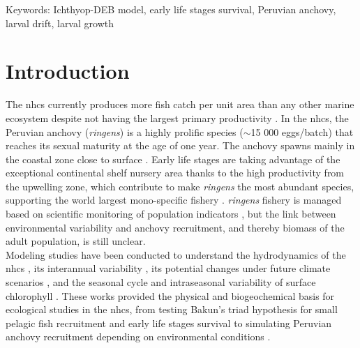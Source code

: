 Keywords: Ichthyop-DEB model, early life stages survival, Peruvian anchovy, larval drift, larval growth

\clearpage
\section{Introduction}\label{Chap3Intro}

The \acrfull{nhcs} currently produces more fish catch per unit area than any other marine ecosystem \citep{BakuWeek2008,ChavBert2008} despite not having the largest primary productivity \citep{ChavMess2009,ChecAsch2017}. In the \acrshort{nhcs}, the Peruvian anchovy (\textit{\gls{ringens}}) is a highly prolific species ($\sim$15 000 eggs/batch) that reaches its sexual maturity at the age of one year. The anchovy spawns mainly in the coastal zone close to surface \citep{GutiSwar2007,GutiRami2008}. Early life stages are taking advantage of the exceptional continental shelf nursery area thanks to the high productivity from the upwelling zone, which contribute to make \textit{\gls{ringens}} the most abundant species, supporting the world largest mono-specific fishery \citep{FreoMull2003,AlheNiqu2004,GutiAkes2016,ChecAsch2017,FAO2020}. \textit{\gls{ringens}} fishery is managed based on scientific monitoring of population indicators \citep{Ayon2000,GutiSwar2007}, but the link between environmental variability and anchovy recruitment, and thereby biomass of the adult population, is still unclear.\\

Modeling studies have been conducted to understand the hydrodynamics of the \acrshort{nhcs} \citep{PenvEche2005,ColaMcwi2012}, its interannual variability \citep{ColaCape2008,EspiEche2017}, its potential changes under future climate scenarios \citep{OerdCola2015,EcheGeva2020}, and the seasonal cycle and intraseasonal variability of surface chlorophyll \citep{EcheAumo2008,EcheAlbe2014}. These works provided the physical and biogeochemical basis for ecological studies in the \acrshort{nhcs}, from testing Bakun's triad hypothesis \citep{Baku1998} for small pelagic fish recruitment and early life stages survival \citep{LettPenv2007} to simulating Peruvian anchovy recruitment depending on environmental conditions \citep{BrocLett2008,BrocCola2009,BrocLett2011,BrocEche2013,XuChai2013,XuRose2015}.\\

